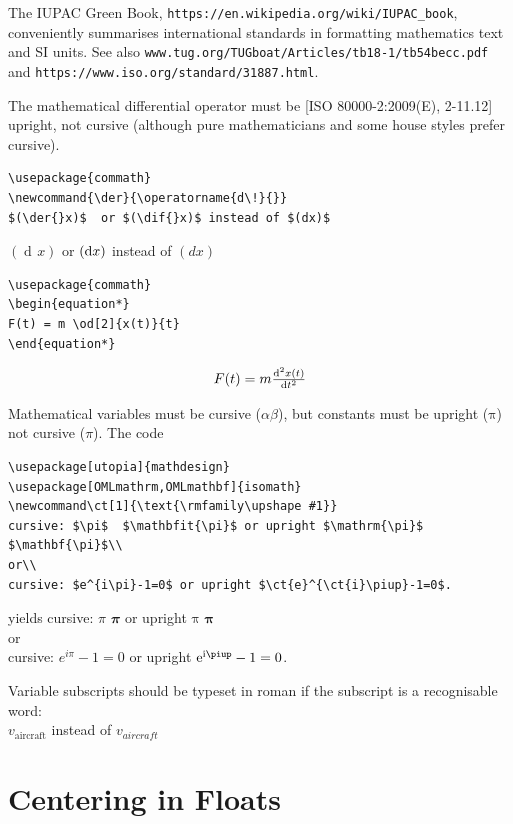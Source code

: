 \documentclass[english]{workpackage}[1996/06/02]
\begin{document}
The IUPAC Green Book, \lstinline{https://en.wikipedia.org/wiki/IUPAC_book}, conveniently summarises international standards in formatting mathematics text and SI units. See also \lstinline{www.tug.org/TUGboat/Articles/tb18-1/tb54becc.pdf} and \lstinline{https://www.iso.org/standard/31887.html}.



The mathematical differential operator must be [ISO 80000-2:2009(E), 2-11.12] upright, not cursive (although pure mathematicians and some house styles prefer cursive).  

\begin{lstlisting}
\usepackage{commath}
\newcommand{\der}{\operatorname{d\!}{}}
$(\der{}x)$  or $(\dif{}x)$ instead of $(dx)$
\end{lstlisting}

\newcommand{\der}{\operatorname{d\!}{}}
$(\der{}x)$  or $(\dif{}x)$ instead of $(dx)$


\begin{lstlisting}
\usepackage{commath}
\begin{equation*}
F(t) = m \od[2]{x(t)}{t}
\end{equation*}
\end{lstlisting}


\begin{equation*}
F(t) = m \od[2]{x(t)}{t}
\end{equation*}


Mathematical variables must be cursive ($\alpha\beta$), but constants must be upright ($\mathrm{\pi}$) not cursive ($\pi$). The code

\begin{lstlisting}
\usepackage[utopia]{mathdesign}
\usepackage[OMLmathrm,OMLmathbf]{isomath}
\newcommand\ct[1]{\text{\rmfamily\upshape #1}}
cursive: $\pi$  $\mathbfit{\pi}$ or upright $\mathrm{\pi}$ $\mathbf{\pi}$\\
or\\
cursive: $e^{i\pi}-1=0$ or upright $\ct{e}^{\ct{i}\piup}-1=0$.
\end{lstlisting}
yields cursive: $\pi$  $\mathbfit{\pi}$ or upright $\mathrm{\pi}$ $\mathbf{\pi}$\\
or \\
cursive: $e^{i\pi}-1=0$ or upright $\ct{e}^{\ct{i}\piup}-1=0$.

Variable subscripts should be typeset in roman if the subscript is a recognisable word:\\
$v_\textrm{aircraft}$ instead of $v_{aircraft}$
\section{Centering in Floats}
\label{sec:CenteringinFloats}
\end{document}
